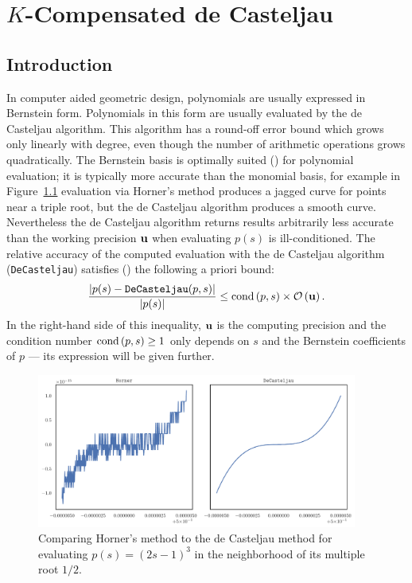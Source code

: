 \chapter{\(K\)-Compensated de Casteljau}\label{chap:k-compensated}

\section{Introduction}

In computer aided geometric design, polynomials are usually expressed in
Bernstein form. Polynomials in this form are usually evaluated by the
de Casteljau algorithm. This algorithm has a round-off error bound
which grows only linearly with degree, even though the number of
arithmetic operations grows quadratically. The Bernstein basis is
optimally suited (\cite{Farouki1987, Delgado2015, Mainar2005})
for polynomial evaluation; it is
typically more accurate than the monomial basis, for example in
Figure~\ref{fig:horner-inferior} evaluation via Horner's method produces
a jagged curve for points near a triple root, but the de Casteljau algorithm
produces a smooth curve. Nevertheless the de Casteljau
algorithm returns results arbitrarily less accurate than the working
precision \(\mathbf{u}\) when evaluating \(p(s)\) is ill-conditioned.
The relative accuracy of the computed
evaluation with the de Casteljau algorithm (\texttt{DeCasteljau}) satisfies
(\cite{Mainar1999}) the following a priori bound:
\begin{equation}\label{eq:de-casteljau-error}
  \frac{\left|p(s) - \mathtt{DeCasteljau}(p, s)\right|}{\left|p(s)\right|} \leq
  \operatorname{cond}\left(p, s\right) \times \mathcal{O}\left(\mathbf{u}\right).
\end{equation}
In the right-hand side of this inequality, \(\mathbf{u}\) is the computing
precision and the condition number \(\operatorname{cond}\left(p, s\right) \geq 1\) only depends
on \(s\) and the Bernstein coefficients of \(p\) --- its expression will
be given further.

\begin{figure}
  \includegraphics[width=0.9375\textwidth]
                  {../images/k-compensated/horner_inferior.pdf}
  \centering
  \captionsetup{width=.75\linewidth}
  \caption{Comparing Horner's method to the de Casteljau method for
    evaluating \(p(s) = (2s - 1)^3\) in the neighborhood of its
    multiple root \(1/2\).}
  \label{fig:horner-inferior}
\end{figure}

